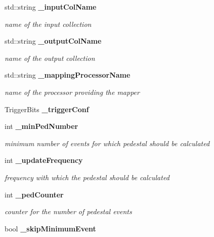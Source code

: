 \begin{DoxyCompactItemize}
\item 
std\-::string {\bf \-\_\-input\-Col\-Name}\label{classCALICE_1_1PedestalProcessor_ae7ff5ea5be5525611f209b13adcd7cee}

\begin{DoxyCompactList}\small\item\em name of the input collection \end{DoxyCompactList}\item 
std\-::string {\bf \-\_\-output\-Col\-Name}\label{classCALICE_1_1PedestalProcessor_aae6d1d5e7b01e107d18f2005d893e0ca}

\begin{DoxyCompactList}\small\item\em name of the output collection \end{DoxyCompactList}\item 
std\-::string {\bf \-\_\-mapping\-Processor\-Name}\label{classCALICE_1_1PedestalProcessor_a2dcdb3d16775dc1b4238d07a6bc27f6f}

\begin{DoxyCompactList}\small\item\em name of the processor providing the mapper \end{DoxyCompactList}\item 
Trigger\-Bits {\bfseries \-\_\-trigger\-Conf}\label{classCALICE_1_1PedestalProcessor_a1cf8086fe463615886f57f0b5be05d82}

\item 
int {\bf \-\_\-min\-Ped\-Number}\label{classCALICE_1_1PedestalProcessor_af438d9894110cd623ef6d95425a5459c}

\begin{DoxyCompactList}\small\item\em minimum number of events for which pedestal should be calculated \end{DoxyCompactList}\item 
int {\bf \-\_\-update\-Frequency}\label{classCALICE_1_1PedestalProcessor_a10205895bc6b3368876faf742beb5581}

\begin{DoxyCompactList}\small\item\em frequency with which the pedestal should be calculated \end{DoxyCompactList}\item 
int {\bf \-\_\-ped\-Counter}\label{classCALICE_1_1PedestalProcessor_a7ab871cec6528446d963c8d828abe0b9}

\begin{DoxyCompactList}\small\item\em counter for the number of pedestal events \end{DoxyCompactList}\item 
bool {\bf \-\_\-skip\-Minimum\-Event}\label{classCALICE_1_1PedestalProcessor_af2eb3cdd7d27a5033bfd669661e61697}


\end{DoxyCompactItemize}
